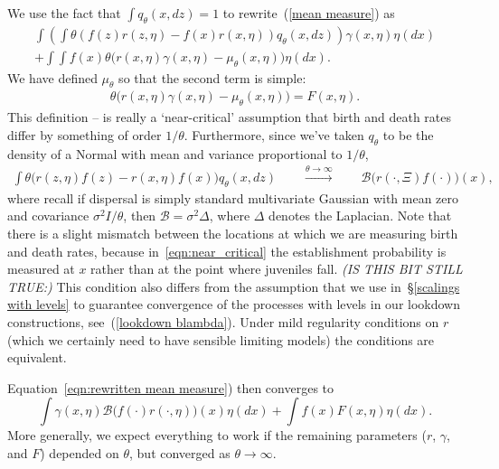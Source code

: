 \documentclass[12pt]{article}
\newcommand{\DG}{\mathcal{B}}  %
\newcommand{\comment}[1]{{\color{blue} \it #1}}
\begin{document}
We use the fact that $\int q_\theta(x,dz)=1$ to rewrite~(\ref{mean measure})
as 
\begin{equation}
\label{eqn:rewritten mean measure}
\begin{split}
    \int\left(
        \int \theta \left( f(z) r(z,\eta)- f(x) r(x,\eta) \right) q_\theta(x,dz)
    \right)
    \gamma(x,\eta)
    \eta(dx)
    \\
    + \int \int f(x) \theta \Big(
        r(x,\eta) \gamma(x,\eta)
        - \mu_\theta(x,\eta)
    \Big) \eta(dx).
\end{split}
\end{equation}
We have defined $\mu_\theta$ so that the second term is simple:
\begin{align*}
    \theta \Big( r(x,\eta) \gamma(x,\eta) - \mu_\theta(x,\eta) \Big)
    = F(x, \eta) .
\end{align*}
This definition --
is really a `near-critical' assumption that birth and death rates
differ by something of order $1/\theta$.
Furthermore, since we've taken $q_\theta$ to be the density of a Normal
with mean and variance proportional to $1/\theta$,
\begin{align} \label{eqn:near_critical}
    \int \theta \Big(
        r(z,\eta) f(z)
        -
        r(x,\eta) f(x)
    \Big) q_\theta(x,dz) 
    \qquad \stackrel{\theta\to\infty}{\longrightarrow} \qquad  
    \DG \big(r(\cdot,\Xi)f(\cdot)\big)(x),
\end{align}
where recall if dispersal is simply standard multivariate Gaussian
with mean zero and covariance $\sigma^2 I / \theta$,
then $\DG = \sigma^2 \Delta$, where $\Delta$ denotes the Laplacian.
Note that there is a slight mismatch between the locations at which we are 
measuring birth and death rates, because in~\eqref{eqn:near_critical}
the establishment probability is 
measured at $x$ rather than at the point where juveniles fall. 
\comment{(IS THIS BIT STILL TRUE:)}
This condition also differs from the assumption that
we use in~\S\ref{scalings with levels} to guarantee convergence of the 
processes with levels in our lookdown 
constructions, see~(\ref{lookdown blambda}). 
Under mild
regularity conditions on $r$ (which we certainly need to have sensible 
limiting models) the conditions are equivalent.  

Equation~\eqref{eqn:rewritten mean measure}) then converges to
\begin{equation} \label{limit of mean measure equation}
\int \gamma(x,\eta)
\DG \big(f(\cdot)r(\cdot,\eta)\big)(x)
\eta(dx)
+
\int f(x)
F(x,\eta)
\eta(dx) .
\end{equation}
More generally, we expect everything to work
if the remaining parameters ($r$, $\gamma$, and $F$)
depended on $\theta$, but converged as $\theta \to \infty$.
\end{document}

